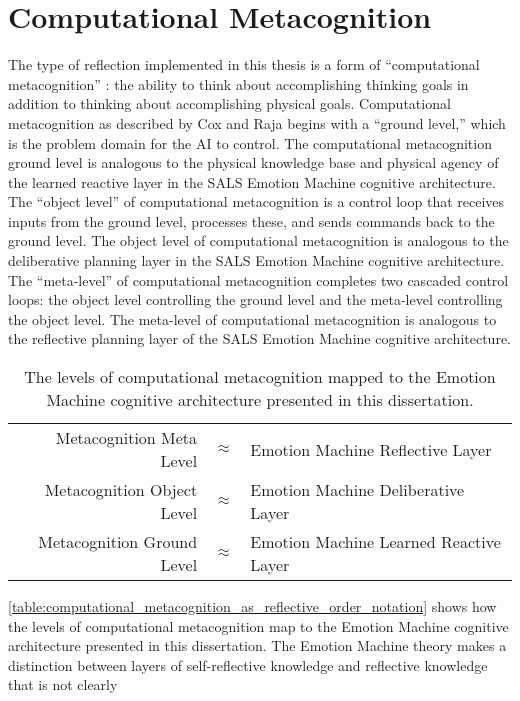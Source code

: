 \section{Computational Metacognition}

The type of reflection implemented in this thesis is a form of
``computational metacognition'' \cite[]{cox_and_raja:2008,cox:2010}:
the ability to think about accomplishing thinking goals in addition to
thinking about accomplishing physical goals.  Computational
metacognition as described by Cox and Raja begins with a ``ground
level,'' which is the problem domain for the AI to control.  The
computational metacognition ground level is analogous to the physical
knowledge base and physical agency of the learned reactive layer in
the SALS Emotion Machine cognitive architecture.  The ``object level''
of computational metacognition is a control loop that receives inputs
from the ground level, processes these, and sends commands back to the
ground level.  The object level of computational metacognition is
analogous to the deliberative planning layer in the SALS Emotion
Machine cognitive architecture.  The ``meta-level'' of computational
metacognition completes two cascaded control loops: the object level
controlling the ground level and the meta-level controlling the object
level.  The meta-level of computational metacognition is analogous to
the reflective planning layer of the SALS Emotion Machine cognitive
architecture.
\begin{table}
\begin{tabular}{|rll|}
\hline
Metacognition Meta Level   &${\approx}$ &Emotion Machine Reflective Layer \\
Metacognition Object Level &${\approx}$ &Emotion Machine Deliberative Layer \\
Metacognition Ground Level &${\approx}$ &Emotion Machine Learned Reactive Layer \\
\hline
\end{tabular}
\caption{The levels of computational metacognition mapped to the
  Emotion Machine cognitive architecture presented in this
  dissertation.}
\label{table:computational_metacognition_as_reflective_order_notation}
\end{table}
\autoref{table:computational_metacognition_as_reflective_order_notation}
shows how the levels of computational metacognition map to the Emotion
Machine cognitive architecture presented in this dissertation.  The
Emotion Machine theory makes a distinction between layers of
self-reflective knowledge and reflective knowledge that is not clearly

